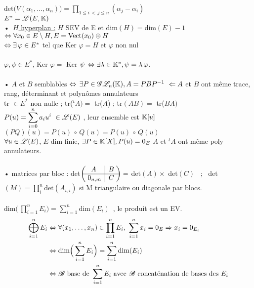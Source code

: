 \documentclass[12 pt]{exampleclass}
\begin{document}
det$\displaystyle{\big(V(\alpha_1, \hdots, \alpha_n)\big) = \prod_{1 \leqslant i \,<\, j \leqslant n} (\alpha_j - \alpha_i) }$\\
$E^* = \mathscr{L}(E,\mathbb{K})$\\
•\, \underline{$H$ hyperplan :} $H$ SEV de E et dim$(H) = $dim$(E) - 1$\\
\text{}\qquad \qquad \qquad \quad $ \Leftrightarrow \forall x_0 \in E\setminus H, E = \text{Vect}(x_0)\oplus H$\\
\text{}\qquad \qquad \qquad \quad $\Leftrightarrow \exists\,\varphi \in E^*$ tel que Ker $\varphi = H$ et $\varphi$ non nul\\
\text{}\\
$\varphi, \psi \in E^*$, Ker $\varphi =$ Ker $\psi \, \Leftrightarrow \exists \lambda \in \mathbb{K}^*, \psi = \lambda\, \varphi$.\\

\text{}\\
• $A$ et $B$ semblables $\Leftrightarrow \, \exists P \in \mathscr{G}\mathscr{L}_n(\mathbb{K}), A = P B P^{-1} \ \Leftarrow A$ et $B$ ont même trace, rang, déterminant et polynômes annulateurs\\
tr $\in E^*$ non nulle ; tr(${}^tA) = $ tr($A$) ; tr$(AB) = $ tr($BA)$\\
$\displaystyle{P(u) = \sum_{i = 0}^n a_i u^i \ \in \sL(E)}$ , leur ensemble est $\mathbb{K}[u]$ \quad $(PQ)(u) = P(u)\, \circ \,Q(u) = P(u)\, \circ \,Q(u)$\\
$\forall u \in \mathscr{L}(E)$, $E$ dim finie, $\exists P\in \mathbb{K}[X], P(u) = 0_E$ \quad $A$ et ${}^tA$ ont même poly annulateurs.\\

\text{}\\
• matrices par bloc : det$\begin{pmatrix} A & \rvline & B\; \\ \hline
\;0_{n,m} & \rvline & C\; \end{pmatrix} = $ det$(A) \times$ det$(C)$ \ ; \ det$\displaystyle{(M) = \prod_i^n \text{det}(A_{i,i}) }$ si M triangulaire ou diagonale par blocs.\\
\text{}\\
dim$\Big(\,\displaystyle{\prod_{i =1}^n E_i \Big) = \sum_{i = 1}^n \text{dim}(E_i)}$\ , le produit est un EV.\\
\begin{equation*}
\begin{aligned}
    \bigoplus_{i =1}^n E_i &\Leftrightarrow \forall (x_1, \dots, x_n)\in \prod_{i=1}^n E_i, \ \sum_{i =1}^n x_i = 0_E \Rightarrow x_i = 0_{E_i}\\
    &\Leftrightarrow \text{dim}\Big(\sum_{i=1}^n E_i \Big) = \sum_{i = 1}^n \text{dim}(E_i)\\
    &\Leftrightarrow \mathscr{B} \text{ base de } \sum_{i=1}^n E_i \text{ avec $\mathscr{B}$ concaténation de bases des } E_i\\
\end{aligned}
\end{equation*}
\end{document}
